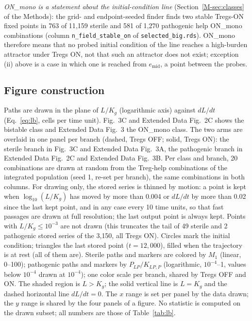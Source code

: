 \documentclass[11pt]{article}
\begin{document}
\emph{ON\_mono is a statement about the initial-condition line} (Section~\ref{M-sec:classes} of the Methods):
the grid- and endpoint-seeded finder finds two stable Tregs-ON fixed points in 763 of
11{,}159 sterile and 581 of 1{,}270 pathogenic help ON\_mono combinations (column
\texttt{n\_field\_stable\_on} of \texttt{selected\_big.rds}). ON\_mono therefore means that no
probed initial condition of the line reaches a high-burden attractor under Tregs ON, not
that such an attractor does not exist; exception (ii) above is a case in which one is
reached from $e_{\mathrm{mid}}$, a point between the probes.

\subsection{Figure construction}

Paths are drawn in the plane of $L/K_g$ (logarithmic axis) against $dL/dt$
(Eq.~\ref{eq:lb}, cells per time unit). Fig.~3C and Extended Data Fig.~2C shows the bistable class and
Extended Data Fig.~3 the ON\_mono class. The two arms are overlaid in one
panel per branch (dashed, Tregs OFF; solid, Tregs ON): the sterile branch in
Fig.~3C and Extended Data Fig.~3A, the pathogenic branch in Extended Data
Fig.~2C and Extended Data Fig.~3B. Per class and branch, 20 combinations are drawn at random from the
Treg-help combinations of the integrated population (seed 1, re-set per branch), the same combinations in both columns.
For drawing only, the stored series is thinned by motion: a point is kept when
$\log_{10}(L/K_g)$ has moved by more than 0.004 or $dL/dt$ by more than 0.02 since the last kept
point, and in any case every 10 time units, so that fast passages are drawn at full
resolution; the last output point is always kept. Points with $L/K_g \le 10^{-3}$ are not
drawn (this truncates the tail of 49 sterile and 2 pathogenic stored series of the 3{,}150, all
Tregs ON). Circles mark the initial condition; triangles the last stored point ($t = 12{,}000$),
filled when the trajectory is at rest (all of them are). Sterile paths and markers are colored
by $M_1$ (linear, 0--100); pathogenic paths and markers by $P_{LP}/K_{LP,P}$ (logarithmic,
$10^{-4}$--1, values below $10^{-4}$ drawn at $10^{-4}$); one color scale per branch, shared by
Tregs OFF and ON. The shaded region is $L>K_g$; the solid vertical line is $L = K_g$ and the dashed
horizontal line $dL/dt = 0$. The $x$ range is set per panel by the data drawn; the $y$ range is
shared by the four panels of a figure. No statistic is computed on the drawn subset; all numbers
are those of Table~\ref{tab:lb}.
\end{document}
